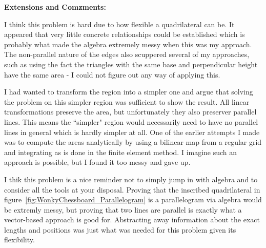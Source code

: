\textbf{Extensions and Comzments:}

I think this problem is hard due to how flexible a quadrilateral can be. It appeared that very little concrete relationships could be established which is probably what made the algebra extremely messy when this was my approach. The non-parallel nature of the edges also scuppered several of my approaches, such as using the fact the triangles with the same base and perpendicular height have the same area - I could not figure out any way of applying this.

I had wanted to transform the region into a simpler one and argue that solving the problem on this simpler region was sufficient to show the result. All linear transformations preserve the area, but unfortunately they also preserver parallel lines. This means the ``simpler" region would necessarily need to have no parallel lines in general which is hardly simpler at all. One of the earlier attempts I made was to compute the areas analytically by using a bilinear map from a regular grid and integrating as is done in the finite element method. I imagine such an approach is possible, but I found it too messy and gave up.

I thik this problem is a nice reminder not to simply jump in with algebra and to consider all the tools at your disposal. Proving that the inscribed quadrilateral in figure~\ref{fig:WonkyChessboard_Parallelogram} is a parallelogram via algebra would be extremly messy, but proving that two lines are parallel is exactly what a vector-based approach is good for. Abstracting away information about the exact lengths and positions was just what was needed for this problem given its flexibility.